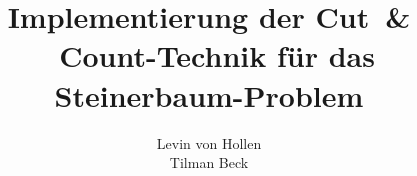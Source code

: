 \documentclass[a4paper,10pt,DIV=12]{scrartcl}
\begin{document}
\author{
Levin von Hollen\\
Tilman Beck\\
}
\title{Implementierung der Cut~\& ~Count-Technik für das
Steinerbaum-Problem}
\maketitle

\setlength{\parindent}{0pt} 









\end{document}
